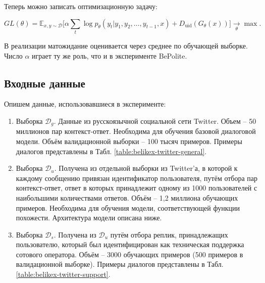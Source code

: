 \documentclass[12pt,a4paper]{amsart}
\begin{document}
Теперь можно записать оптимизационную задачу:

\begin{equation} \label{eq:rl-belikex-loss}
GL(\theta) = \mathbb{E}_{x,y \sim \mathcal{D}}\big[\alpha\sum_{t} \log p_\theta (y_t | y_1, y_2, \dots, y_{t-1}, x) + D_{\text{uid}}(G_\theta(x))\big] \xrightarrow[\theta]{} \max.
\end{equation}

В реализации матожидание оценивается через среднее по обучающей выборке. Число $\alpha$ играет ту же роль, что и в эксперименте BePolite.

\subsection{Входные данные}

Опишем данные, использовавшиеся в эксперименте:

\begin{enumerate}
	\item Выборка $ \mathcal{D}_g $. Данные из русскоязычной социальной сети Twitter. Объем -- 50 миллионов пар контекст-ответ. Необходима для обучения базовой диалоговой модели. Объём валидационной выборки -- 100 тысяч примеров. Примеры диалогов представлены в Табл. \ref{table:belikex-twitter-general}.
	\item Выборка $ \mathcal{D}_u $. Получена из отдельной выборки из Twitter'а, в которой к каждому сообщению привязан идентификатор пользователя, путём отбора пар контекст-ответ, ответ в которых принадлежит одному из 1000 пользователей с наибольшими количествами ответов. Объём -- 1,2 миллиона обучающих примеров. Необходима для обучения модели, соответствующей функции похожести. Архитектура модели описана ниже.
	\item Выборка $\mathcal{D}_s$. Получена из $\mathcal{D}_u$ путём отбора реплик, принадлежащих пользователю, который был идентифицирован как техническая поддержка сотового оператора. Объём -- 3000 обучающих примеров (500 примеров в валидационной выборке). Примеры диалогов представлены в Табл. \ref{table:belikex-twitter-support}.
\end{enumerate}
\end{document}
